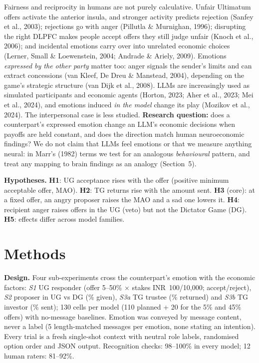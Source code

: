 \documentclass[10pt,a4paper]{article}
\begin{document}
Fairness and reciprocity in humans are not purely calculative. Unfair Ultimatum offers activate the anterior insula,
and stronger activity predicts rejection (Sanfey et al., 2003); rejections go with anger (Pillutla \& Murnighan,
1996); disrupting the right DLPFC makes people accept offers they still judge unfair (Knoch et al., 2006); and
incidental emotions carry over into unrelated economic choices (Lerner, Small \& Loewenstein, 2004; Andrade \& Ariely,
2009). Emotions \emph{expressed by the other party} matter too: anger signals the sender's limits and can extract
concessions (van Kleef, De Dreu \& Manstead, 2004), depending on the game's strategic structure (van Dijk et al., 2008).
LLMs are increasingly used as simulated participants and economic agents (Horton, 2023; Aher et al., 2023; Mei et al.,
2024), and emotions induced \emph{in the model} change its play (Mozikov et al., 2024). The interpersonal case is less
studied. \textbf{Research question:} does a counterpart's expressed emotion change an LLM's economic decisions when
payoffs are held constant, and does the direction match human neuroeconomic findings? We do not claim that LLMs feel
emotions or that we measure anything neural: in Marr's (1982) terms we test for an analogous \emph{behavioural}
pattern, and treat any mapping to brain findings as an analogy (Section~5).

\textbf{Hypotheses.} \textbf{H1}: UG acceptance rises with the offer (positive minimum acceptable offer, MAO).
\textbf{H2}: TG returns rise with the amount sent. \textbf{H3} (core): at a fixed offer, an angry proposer raises the
MAO and a sad one lowers it. \textbf{H4}: recipient anger raises offers in the UG (veto) but not the Dictator Game
(DG). \textbf{H5}: effects differ across model families.

\section{Methods}

\textbf{Design.} Four sub-experiments cross the counterpart's emotion with the economic factors: \emph{S1} UG responder
(offer 5--50\% $\times$ stakes INR~100/10,000; accept/reject), \emph{S2} proposer in UG vs DG (\% given), \emph{S3a} TG
trustee (\% returned) and \emph{S3b} TG investor (\% sent); 130 cells per model (110 planned + 20 for
the 5\% and 45\% offers) with no-message baselines. Emotion was
conveyed by message content, never a label (5 length-matched messages per emotion, none stating an intention). Every
trial is a fresh single-shot context with neutral role labels, randomised option order and JSON output. Recognition
checks: 98--100\% in every model; 12 human raters: 81--92\%.
\end{document}
